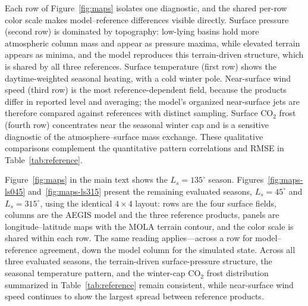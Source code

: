 \documentclass{article} %
\newcommand{\co}{CO$_2$}
\begin{document}
Each row of Figure~\ref{fig:maps} isolates one diagnostic, and the shared per-row color scale makes model--reference differences visible directly. Surface pressure (second row) is dominated by topography: low-lying basins hold more atmospheric column mass and appear as pressure maxima, while elevated terrain appears as minima, and the model reproduces this terrain-driven structure, which is shared by all three references. Surface temperature (first row) shows the daytime-weighted seasonal heating, with a cold winter pole. Near-surface wind speed (third row) is the most reference-dependent field, because the products differ in reported level and averaging; the model's organized near-surface jets are therefore compared against references with distinct sampling. Surface \co{} frost (fourth row) concentrates near the seasonal winter cap and is a sensitive diagnostic of the atmosphere--surface mass exchange. These qualitative comparisons complement the quantitative pattern correlations and RMSE in Table~\ref{tab:reference}.

Figure~\ref{fig:maps} in the main text shows the $L_s=135^\circ$ season. Figures~\ref{fig:maps-ls045} and~\ref{fig:maps-ls315} present the remaining evaluated seasons, $L_s=45^\circ$ and $L_s=315^\circ$, using the identical $4\times4$ layout: rows are the four surface fields, columns are the AEGIS model and the three reference products, panels are longitude--latitude maps with the MOLA terrain contour, and the color scale is shared within each row. The same reading applies---across a row for model--reference agreement, down the model column for the simulated state. Across all three evaluated seasons, the terrain-driven surface-pressure structure, the seasonal temperature pattern, and the winter-cap \co{} frost distribution summarized in Table~\ref{tab:reference} remain consistent, while near-surface wind speed continues to show the largest spread between reference products.
\end{document}
